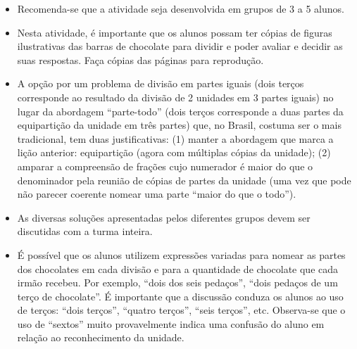 \begin{orientacoes}{}{}
\begin{itemize} %
   \item Recomenda-se que a atividade seja desenvolvida em grupos de 3 a 5 alunos.
   \item Nesta atividade, é importante que os alunos possam ter cópias de figuras ilustrativas das barras de chocolate para dividir e poder avaliar e decidir as suas respostas. Faça cópias das páginas para reprodução.
   \item A opção por um problema de divisão em partes iguais (dois terços corresponde ao resultado da divisão de 2 unidades em 3 partes iguais) no lugar da abordagem ``parte-todo'' (dois terços corresponde a duas partes da equipartição da unidade em três partes) que, no Brasil, costuma ser o mais tradicional, tem duas justificativas: (1) manter a abordagem que marca a lição anterior: equipartição (agora com múltiplas cópias da unidade); (2) amparar a compreensão de frações cujo numerador é maior do que o denominador pela reunião de cópias de partes da unidade (uma vez que pode não parecer coerente nomear uma parte ``maior do que o todo'').
   \item As diversas soluções apresentadas pelos diferentes grupos devem ser discutidas com a turma inteira.
   \item É possível que os alunos utilizem expressões variadas para nomear as partes dos chocolates em cada divisão e para a quantidade de chocolate que cada irmão recebeu. Por exemplo, ``dois dos seis pedaços'', ``dois pedaços de um terço de chocolate''. É importante que a discussão conduza os alunos ao uso de terços:       ``dois terços'', ``quatro terços'', ``seis terços'', etc. Observa-se que o uso de ``sextos'' muito provavelmente indica uma confusão do aluno em relação ao reconhecimento da unidade.
  
\end{itemize} %

\end{orientacoes}

